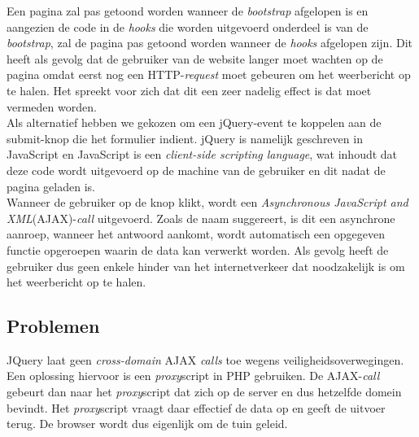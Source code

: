 Een pagina zal pas getoond worden wanneer de \textit{bootstrap} afgelopen is en aangezien de code in de \textit{hooks} die worden uitgevoerd onderdeel is van de \textit{bootstrap}, zal de pagina pas getoond worden wanneer de \textit{hooks} afgelopen zijn. Dit heeft als gevolg dat de gebruiker van de website langer moet wachten op de pagina omdat eerst nog een HTTP-\textit{request} moet gebeuren om het weerbericht op te halen. Het spreekt voor zich dat dit een zeer nadelig effect is dat moet vermeden worden.\\
Als alternatief hebben we gekozen om een jQuery-event te koppelen aan de submit-knop die het formulier indient. jQuery is namelijk geschreven in JavaScript en JavaScript is een \textit{client-side \textit{scripting} language}, wat inhoudt dat deze code wordt uitgevoerd op de machine van de gebruiker en dit nadat de pagina geladen is.\\
Wanneer de gebruiker op de knop klikt, wordt een \textit{Asynchronous JavaScript and XML}(AJAX)-\textit{call} uitgevoerd.
Zoals de naam suggereert, is dit een asynchrone aanroep, wanneer het antwoord aankomt, wordt automatisch een opgegeven functie opgeroepen waarin de data kan verwerkt worden. Als gevolg heeft de gebruiker dus geen enkele hinder van het internetverkeer dat noodzakelijk is om het weerbericht op te halen.


\subsection{Problemen}

JQuery laat geen \textit{cross-domain} AJAX \textit{calls} toe wegens veiligheidsoverwegingen. Een oplossing hiervoor is een \textit{proxy}script in PHP gebruiken.
De AJAX-\textit{call} gebeurt dan naar het \textit{proxy}script dat zich op de server en dus hetzelfde domein bevindt. Het \textit{proxy}script vraagt daar effectief de data op en geeft de uitvoer terug.
De browser wordt dus eigenlijk om de tuin geleid. \cite{crossDomainProblem}
